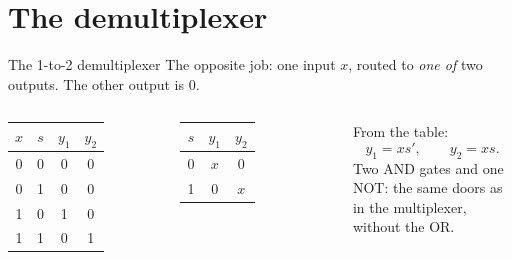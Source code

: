 \documentclass[10pt]{wosm-slides}
\begin{document}
\section{The demultiplexer}

\begin{frame}{The 1-to-2 demultiplexer}
  The opposite job: one input $x$, routed to \emph{one of} two outputs. The other
  output is 0.

  \medskip
  \begin{columns}[c, totalwidth=\textwidth]
      \centering
      \small
      \begin{tabular}{@{}cc|cc@{}}
        $x$ & $s$ & $y_1$ & $y_2$ \\
        \midrule
        0 & 0 & 0 & 0 \\
        0 & 1 & 0 & 0 \\
        1 & 0 & 1 & 0 \\
        1 & 1 & 0 & 1 \\
      \end{tabular}\par\medskip
      \begin{tabular}{@{}c|cc@{}}
        $s$ & $y_1$ & $y_2$ \\
        \midrule
        0 & $x$ & 0 \\
        1 & 0 & $x$ \\
      \end{tabular}
      \centering
      From the table:
      \[ y_1 = x s', \qquad y_2 = x s . \]
      Two AND gates and one NOT: the same doors as in the multiplexer, without the
      OR.
  \end{columns}

  \medskip
\end{frame}
\end{document}
